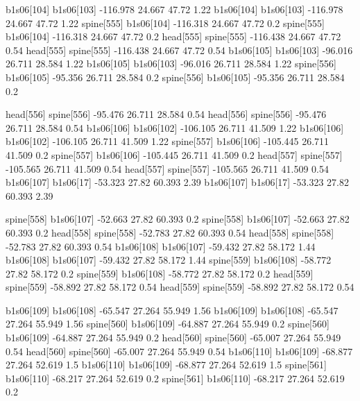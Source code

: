 b1s06[104]    b1s06[103]    -116.978    24.667    47.72    1.22
b1s06[104]    b1s06[103]    -116.978    24.667    47.72    1.22
spine[555]    b1s06[104]    -116.318    24.667    47.72    0.2
spine[555]    b1s06[104]    -116.318    24.667    47.72    0.2
head[555]    spine[555]    -116.438    24.667    47.72    0.54
head[555]    spine[555]    -116.438    24.667    47.72    0.54
b1s06[105]    b1s06[103]    -96.016    26.711    28.584    1.22
b1s06[105]    b1s06[103]    -96.016    26.711    28.584    1.22
spine[556]    b1s06[105]    -95.356    26.711    28.584    0.2
spine[556]    b1s06[105]    -95.356    26.711    28.584    0.2


head[556]    spine[556]    -95.476    26.711    28.584    0.54
head[556]    spine[556]    -95.476    26.711    28.584    0.54
b1s06[106]    b1s06[102]    -106.105    26.711    41.509    1.22
b1s06[106]    b1s06[102]    -106.105    26.711    41.509    1.22
spine[557]    b1s06[106]    -105.445    26.711    41.509    0.2
spine[557]    b1s06[106]    -105.445    26.711    41.509    0.2
head[557]    spine[557]    -105.565    26.711    41.509    0.54
head[557]    spine[557]    -105.565    26.711    41.509    0.54
b1s06[107]    b1s06[17]    -53.323    27.82    60.393    2.39
b1s06[107]    b1s06[17]    -53.323    27.82    60.393    2.39


spine[558]    b1s06[107]    -52.663    27.82    60.393    0.2
spine[558]    b1s06[107]    -52.663    27.82    60.393    0.2
head[558]    spine[558]    -52.783    27.82    60.393    0.54
head[558]    spine[558]    -52.783    27.82    60.393    0.54
b1s06[108]    b1s06[107]    -59.432    27.82    58.172    1.44
b1s06[108]    b1s06[107]    -59.432    27.82    58.172    1.44
spine[559]    b1s06[108]    -58.772    27.82    58.172    0.2
spine[559]    b1s06[108]    -58.772    27.82    58.172    0.2
head[559]    spine[559]    -58.892    27.82    58.172    0.54
head[559]    spine[559]    -58.892    27.82    58.172    0.54


b1s06[109]    b1s06[108]    -65.547    27.264    55.949    1.56
b1s06[109]    b1s06[108]    -65.547    27.264    55.949    1.56
spine[560]    b1s06[109]    -64.887    27.264    55.949    0.2
spine[560]    b1s06[109]    -64.887    27.264    55.949    0.2
head[560]    spine[560]    -65.007    27.264    55.949    0.54
head[560]    spine[560]    -65.007    27.264    55.949    0.54
b1s06[110]    b1s06[109]    -68.877    27.264    52.619    1.5
b1s06[110]    b1s06[109]    -68.877    27.264    52.619    1.5
spine[561]    b1s06[110]    -68.217    27.264    52.619    0.2
spine[561]    b1s06[110]    -68.217    27.264    52.619    0.2


